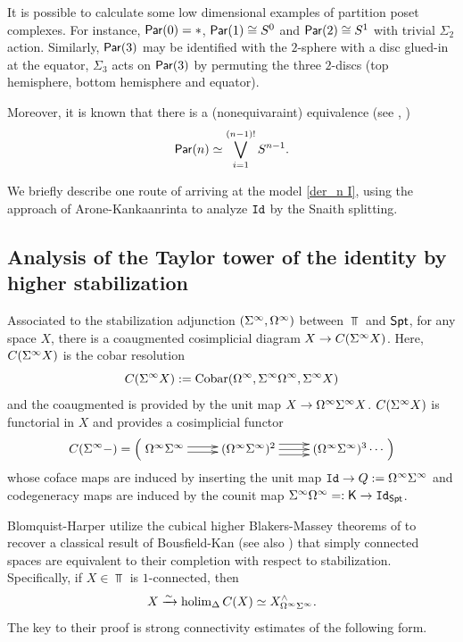 \begin{example}
    It is possible to calculate some low dimensional examples of partition poset complexes. For instance, $\mathsf{Par}(0)=*$, $\mathsf{Par}(1)\cong S^0$ and $\mathsf{Par}(2)\cong S^1$ with trivial $\Sigma_2$ action. Similarly, $\mathsf{Par}(3)$ may be identified with the $2$-sphere with a disc glued-in at the equator, $\Sigma_3$ acts on $\mathsf{Par}(3)$ by permuting the three $2$-discs (top hemisphere, bottom hemisphere and equator).
    
    Moreover, it is known that there is a (nonequivaraint) equivalence (see \cite{Joh}, \cite{Ar-Mah}) \[\mathsf{Par}(n)\simeq \bigvee_{i=1}^{(n-1)!}S^{n-1}.\] 
\end{example}

We briefly describe one route of arriving at the model \eqref{der_n I}, using the approach of Arone-Kankaanrinta \cite{AK} to analyze $\mathtt{Id}$ by the Snaith splitting. 

\subsection{Analysis of the Taylor tower of the identity by higher stabilization}
Associated to the stabilization adjunction $(\Sigma^{\infty}, \Omega^{\infty})$ between $\Top$ and $\mathsf{Spt}$, for any space $X$, there is a coaugmented cosimplicial diagram $X\to C(\Sigma^{\infty} X)$. Here, $C(\Sigma^{\infty} X)$ is the cobar resolution \[C(\Sigma^{\infty} X):=\operatorname{Cobar}(\Omega^{\infty}, \Sigma^{\infty}\Omega^{\infty}, \Sigma^{\infty} X)\] and the coaugmented is provided by the unit map $X\to \Omega^{\infty} \Sigma^{\infty} X$. $C(\Sigma^{\infty} X)$ is functorial in $X$ and provides a cosimplicial functor \begin{equation}
\label{eq:loop-susp-cosimplicial-res}
    C(\Sp -) = \left( \xymatrix{
    \U \Sp  \ar@<.5 ex>[r] \ar@<-.5ex>[r] &
    (\U \Sp)^2 \ar@<1 ex>[r] \ar[r] \ar@<-1 ex>[r] &
    (\U \Sp)^3 \cdots
    }\right)
\end{equation} whose coface maps are induced by inserting the unit map $\mathtt{Id} \to Q:= \Omega^{\infty} \Sigma^{\infty}$ and codegeneracy maps are induced by the counit map $\Sigma^{\infty}\Omega^{\infty}=: \mathsf{K}\to \mathtt{Id}_{\mathsf{Spt}}$. 

Blomquist-Harper \cite{BH} utilize the cubical higher Blakers-Massey theorems of \cite{Goo-Calc2} to recover a classical result of Bousfield-Kan \cite{BK} (see also \cite{Carl}) that simply connected spaces are equivalent to their completion with respect to stabilization. Specifically, if $X\in \Top$ is $1$-connected, then \[X\xrightarrow{\sim} \operatorname{holim}_{\Delta}C(X)\simeq X_{\Omega^{\infty} \Sigma^{\infty}}^{\wedge}.\] The key to their proof is strong connectivity estimates of the following form.

